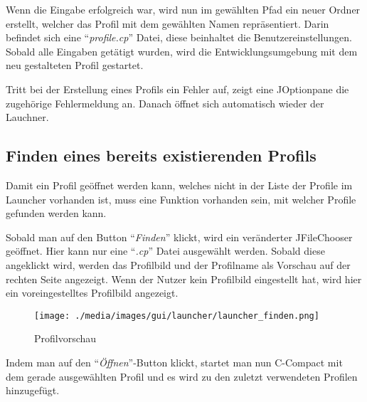 Wenn die Eingabe erfolgreich war, wird nun im gewählten Pfad ein neuer Ordner erstellt, welcher das Profil mit dem gewählten Namen repräsentiert. Darin befindet sich eine "`\textit{profile.cp}"' Datei, diese beinhaltet die Benutzereinstellungen. Sobald alle Eingaben getätigt wurden, wird die Entwicklungsumgebung mit dem neu gestalteten Profil gestartet.

Tritt bei der Erstellung eines Profils ein Fehler auf, zeigt eine JOptionpane die zugehörige Fehlermeldung an. Danach öffnet sich automatisch wieder der Lauchner. 

\subsection{Finden eines bereits existierenden Profils}
Damit ein Profil geöffnet werden kann, welches nicht in der Liste der Profile im Launcher vorhanden ist, muss eine Funktion vorhanden sein, mit welcher Profile gefunden werden kann.

Sobald man auf den Button "`\textit{Finden}"' klickt, wird ein veränderter JFileChooser geöffnet. Hier kann nur eine "`\textit{.cp}"' Datei ausgewählt werden. Sobald diese angeklickt wird, werden das Profilbild und der Profilname als Vorschau auf der rechten Seite angezeigt. Wenn der Nutzer kein Profilbild eingestellt hat, wird hier ein voreingestelltes Profilbild angezeigt.

\begin{figure}[h] 
   \centering
     \texttt{[image: ./media/images/gui/launcher/launcher\_finden.png]}
  \caption{ Profilvorschau}
  \label{fig:Bild1}
\end{figure}

Indem man auf den "`\textit{Öffnen}"'-Button klickt, startet man nun C-Compact mit dem gerade ausgewählten Profil und es wird zu den zuletzt verwendeten Profilen hinzugefügt.
